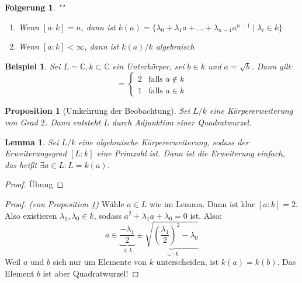 \documentclass[a4paper,12pt,numbers=noenddot,parskip=full]{scrartcl}
\newcommand{\setC}{\mathbb{C}}
\theoremstyle{dotless}
\newtheorem{corollary}[theorem]{Folgerung}
\newtheorem{proposition}[theorem]{Proposition}
\newtheorem{lemma}[theorem]{Lemma}
\newtheorem{example}[theorem]{Beispiel}
\theoremstyle{remark}
\begin{document}
	\begin{corollary}""
		\begin{enumerate}
			\item Wenn $[a:k] = n$, dann ist $k(a) = \{ \lambda_0 + \lambda_1 a + \dots + \lambda_{n-1} a^{n-1} \mid \lambda_i \in k \}$
			\item Wenn $[a:k] < \infty$, dann ist $k(a)/k$ algebraisch
		\end{enumerate}
	\end{corollary}

	\begin{example}
		Sei $L = \setC, k \subset \setC$ ein Unterkörper, sei $b \in k$ und $a = \sqrt{b}$. Dann gilt:
		\begin{equation*}
			[k(a): k] = \begin{cases}
				2 & \text{falls $a \notin k$} \\
				1 & \text{falls $a \in k$}
			\end{cases}
		\end{equation*}
	\end{example}

	\begin{proposition}[Umkehrung der Beobachtung]
		\label{prop:umkehrungDerBeobachtung}
		Sei $L/k$ eine Körpererweiterung von Grad $2$. Dann entsteht $L$ durch Adjunktion einer Quadratwurzel.
	\end{proposition}

	\begin{lemma}
		Sei $L/k$ eine algebraische Körpererweiterung, sodass der Erweiterungsgrad $[L:k]$ eine Primzahl ist. Dann ist die Erweiterung einfach, das heißt $\exists a \in L: L = k(a)$.
	\end{lemma}

	\begin{proof}
		Übung
	\end{proof}

	\begin{proof}\textit{(von Proposition \ref{prop:umkehrungDerBeobachtung})}
		Wähle $a \in L$ wie im Lemma. Dann ist klar $[a:k] = 2$. Also existieren $\lambda_1, \lambda_0 \in k$, sodass $a^2 + \lambda_1 a + \lambda_0 = 0$ ist. Also:
		\begin{equation*}
			a \in \underbrace{\frac{- \lambda_1}{2}}_{\in k} \pm \underbrace{\sqrt{\left( \frac{\lambda_1}{2} \right)^2 - \lambda_0}}_{=:b}
		\end{equation*}
		Weil $a$ und $b$ sich nur um Elemente von $k$ unterscheiden, ist $k(a) = k(b)$. Das Element $b$ ist aber Quadratwurzel!
	\end{proof}
\end{document}

